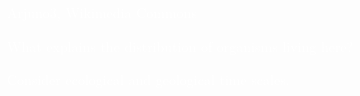 \documentclass[t]{beamer}
\begin{document}
{
\begin{frame}[b,plain]
\hfill\tiny{\textcolor{white}{Arjuno3, Wikimedia Commons}}
\end{frame}
}

{
\begin{frame}[t,plain]
\end{frame}
}

{
\begin{frame}[t,plain]
\end{frame}
}

{
\begin{frame}[t,plain]{\textcolor{white}{What explains the distribution of organisms living here?}}

	\hangpara\textcolor{white}{Consider ecological and geological time scales.}
\end{frame}
}

%	
%	
%	
%	

%
%
%
%
%
%
%
%
%
%
%
%
\end{document}
